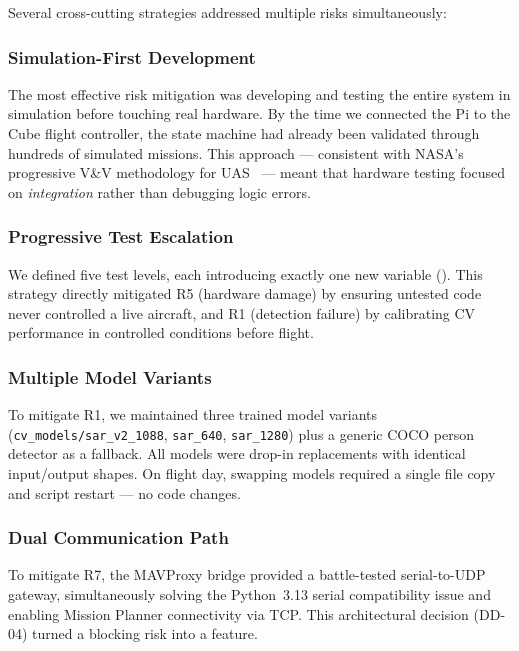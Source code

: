 Several cross-cutting strategies addressed multiple risks simultaneously:

\subsubsection{Simulation-First Development}

The most effective risk mitigation was developing and testing the entire system in simulation before touching real hardware. By the time we connected the Pi to the Cube flight controller, the state machine had already been validated through hundreds of simulated missions. This approach --- consistent with NASA's progressive V\&V methodology for UAS~\cite{nasa2015vv} --- meant that hardware testing focused on \textit{integration} rather than debugging logic errors.

\subsubsection{Progressive Test Escalation}

We defined five test levels, each introducing exactly one new variable (). This strategy directly mitigated R5 (hardware damage) by ensuring untested code never controlled a live aircraft, and R1 (detection failure) by calibrating CV performance in controlled conditions before flight.

\subsubsection{Multiple Model Variants}

To mitigate R1, we maintained three trained model variants (\texttt{cv\_models/sar\_v2\_1088}, \texttt{sar\_640}, \texttt{sar\_1280}) plus a generic COCO person detector as a fallback. All models were drop-in replacements with identical input/output shapes. On flight day, swapping models required a single file copy and script restart --- no code changes.

\subsubsection{Dual Communication Path}

To mitigate R7, the MAVProxy bridge provided a battle-tested serial-to-UDP gateway, simultaneously solving the Python~3.13 serial compatibility issue and enabling Mission Planner connectivity via TCP. This architectural decision (DD-04) turned a blocking risk into a feature.

